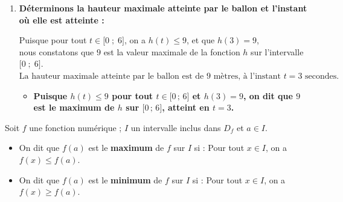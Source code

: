 \documentclass[10pt, a4paper]{article}
\begin{document}
\begin{Solution}[ACTIVITÉ][3]
\begin{enumerate}[leftmargin=*,itemsep=1pt]
\begin{enumerate}[leftmargin=*,itemsep=1pt]
        Soit $t \in \big[0 \;;\; 6\big]$.
        On a :
        \begin{align*}
            (t - 3)^2 &\geq 0 \quad \text{(car le carré d'un réel est toujours positif)} \\
            \text{ équivaut à } \quad -(t - 3)^2 &\leq 0 \\
            \text{ équivaut à } \quad h(t) - 9 &\leq 0 \\
            \text{ équivaut à } \quad h(t) &\leq 9
        \end{align*}
        Donc : \quad pour tout $t \in \big[0 \;;\; 6\big]$, on a $h(t) \leq 9$.
    \end{enumerate}

    \item \textbf{Déterminons la hauteur maximale atteinte par le ballon et l'instant où elle est atteinte :}
    
    Puisque pour tout $t \in \big[0 \;;\; 6\big]$, on a $h(t) \leq 9$, et que $h(3) = 9$,  \\    
    nous constatons que $9$ est la valeur maximale de la fonction $h$ sur l'intervalle $\big[0 \;;\; 6\big]$. \\
     $\text{La hauteur maximale atteinte par le ballon est de } 9 \text{ mètres, à l'instant } t = 3 \text{ secondes.}$
    \begin{itemize}[label=$\blacktriangleright$, leftmargin=*, nosep]
    \item \textbf{Puisque $h(t) \leq 9$ pour tout $t \in \big[0\,;\,6\big]$ et $h(3) = 9$, on dit que $9$ est le \textcolor{PrimaryColor}{maximum} de $h$ sur $\big[0\,;\,6\big]$, atteint en $t = 3$.}
    \end{itemize}
\end{enumerate}
\end{Solution}


\begin{Definition}[]
Soit $f$ une fonction numérique ; $I$ un intervalle inclus dans $D_f$ et $a \in I$.
\begin{itemize}[leftmargin=*,itemsep=0.5pt]
    \item On dit que $f(a)$ est le \textbf{maximum} de $f$ sur $I$ si :
          Pour tout $x \in I$, on a $f(x) \leq f(a)$.
    \item On dit que $f(a)$ est le \textbf{minimum} de $f$ sur $I$ si :
          Pour tout $x \in I$, on a $f(x) \geq f(a)$.
\end{itemize}
\end{Definition}
\end{document}
